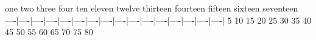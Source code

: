 one  two three four  ten eleven twelve
thirteen fourteen fifteen sixteen
seventeen
----|----|----|----|----|----|----|----|----|----|----|----|----|----|----|----|
   5   10   15   20   25   30   35   40   45   50   55   60   65   70   75   80